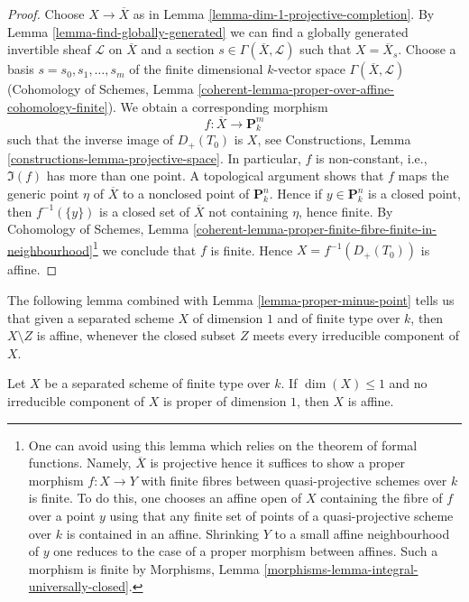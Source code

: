 \begin{proof}
Choose $X \to \overline{X}$ as in
Lemma \ref{lemma-dim-1-projective-completion}.
By Lemma \ref{lemma-find-globally-generated}
we can find a globally generated invertible sheaf $\mathcal{L}$
on $\overline{X}$ and a section $s \in \Gamma(\overline{X}, \mathcal{L})$
such that $X = \overline{X}_s$.
Choose a basis $s = s_0, s_1, \ldots, s_m$ of the finite dimensional
$k$-vector space $\Gamma(\overline{X}, \mathcal{L})$
(Cohomology of Schemes, Lemma
\ref{coherent-lemma-proper-over-affine-cohomology-finite}).
We obtain a corresponding morphism
$$
f : \overline{X} \longrightarrow \mathbf{P}^m_k
$$
such that the inverse image of $D_{+}(T_0)$ is $X$, see
Constructions, Lemma \ref{constructions-lemma-projective-space}.
In particular, $f$ is non-constant, i.e., $\Im(f)$ has more
than one point. A topological argument shows that $f$ maps the generic
point $\eta$ of $\overline{X}$ to a nonclosed point of $\mathbf{P}^n_k$.
Hence if $y \in \mathbf{P}^n_k$ is a closed point, then $f^{-1}(\{y\})$
is a closed set of $\overline{X}$ not containing $\eta$, hence finite.
By Cohomology of Schemes, Lemma
\ref{coherent-lemma-proper-finite-fibre-finite-in-neighbourhood}\footnote{One
can avoid using this lemma which relies on the theorem of formal
functions. Namely, $\overline{X}$ is projective hence it suffices to show
a proper morphism $f : X \to Y$ with finite fibres between quasi-projective
schemes over $k$ is finite. To do this, one chooses an affine open of $X$
containing the fibre of $f$ over a point $y$ using that any finite set of
points of a quasi-projective scheme over $k$ is contained in an affine.
Shrinking $Y$ to a small affine neighbourhood of $y$ one reduces to the
case of a proper morphism between affines. Such a morphism is finite by
Morphisms, Lemma \ref{morphisms-lemma-integral-universally-closed}.}
we conclude that $f$ is finite. Hence $X = f^{-1}(D_{+}(T_0))$
is affine.
\end{proof}

\noindent
The following lemma combined with Lemma \ref{lemma-proper-minus-point}
tells us that given a separated scheme $X$ of dimension $1$ and
of finite type over $k$, then $X \setminus Z$ is affine, whenever the
closed subset $Z$ meets every irreducible component of $X$.

\begin{lemma}
\label{lemma-dim-1-nonproper-affine}
Let $X$ be a separated scheme of finite type over $k$.
If $\dim(X) \leq 1$ and no irreducible component of $X$
is proper of dimension $1$, then $X$ is affine.
\end{lemma}

